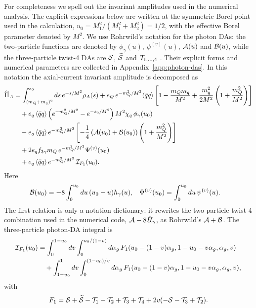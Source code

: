 \documentclass[aps,prd,preprint,nofootinbib,superscriptaddress]{revtex4-2}
\newcommand{\qqbar}{\langle\bar q q\rangle}
\begin{document}
For completeness we spell out the invariant amplitudes used in the numerical
analysis.  The explicit expressions below are written at the symmetric Borel
point used in the calculation, $u_0=M_1^2/(M_1^2+M_2^2)=1/2$, with the effective
Borel parameter denoted by $M^2$.  We use Rohrwild's notation for the photon
DAs: the two-particle functions are denoted by
$\phi_\gamma(u)$, $\psi^{(v)}(u)$, ${\cal A}(u)$ and ${\cal B}(u)$, while the
three-particle twist-4 DAs are
${\cal S}$, $\widetilde{\cal S}$ and ${\cal T}_{1,\ldots,4}$
\cite{Rohrwild:2007yt}.  Their explicit forms and numerical parameters are
collected in Appendix~\ref{app:photon-das}.  In this notation the
axial-current invariant amplitude is decomposed as
\begin{align}
  \widehat\Pi_A
  &=
  \int_{(m_Q+m_q)^2}^{s_0}ds\,e^{-s/M^2}\rho_A(s)
  +e_Q\,e^{-m_Q^2/M^2}\qqbar
  \left[
    1-\frac{m_Q m_q}{M^2}
    +\frac{m_q^2}{2M^2}\left(1+\frac{m_Q^2}{M^2}\right)
  \right]
  \notag\\
  &\quad
  +e_q\,\qqbar\left(e^{-m_Q^2/M^2}-e^{-s_0/M^2}\right)
  M^2\chi_q\,\phi_\gamma(u_0)
  \notag\\
  &\quad
  -e_q\,\qqbar\,e^{-m_Q^2/M^2}
  \left[
    -\frac14\left({\cal A}(u_0)+{\cal B}(u_0)\right)
    \left(1+\frac{m_Q^2}{M^2}\right)
  \right]
  \notag\\
  &\quad
  +2e_q f_{3\gamma}m_Q\,e^{-m_Q^2/M^2}\Psi^{(v)}(u_0)
  \notag\\
  &\quad
  +e_q\,\qqbar\,e^{-m_Q^2/M^2}\,{\cal I}_{F_1}(u_0).
  \label{eq:pi-a-explicit}
\end{align}
Here
\begin{align}
  {\cal B}(u_0)
  &=-8\int_0^{u_0}du\,(u_0-u)h_\gamma(u),
  &
  \Psi^{(v)}(u_0)
  &=\int_0^{u_0}du\,\psi^{(v)}(u).
  \label{eq:b-psi-def}
\end{align}
The first relation is only a notation dictionary: it rewrites the
two-particle twist-4 combination used in the numerical code,
${\cal A}-8\bar H_\gamma$, as Rohrwild's
${\cal A}+{\cal B}$.  The three-particle photon-DA integral is
\begin{align}
  {\cal I}_{F_1}(u_0)
  &=
  \int_0^{1-u_0}dv\int_0^{u_0/(1-v)}d\alpha_g\,
  F_1(u_0-(1-v)\alpha_g,1-u_0-v\alpha_g,\alpha_g,v)
  \notag\\
  &\quad
  +\int_{1-u_0}^{1}dv\int_0^{(1-u_0)/v}d\alpha_g\,
  F_1(u_0-(1-v)\alpha_g,1-u_0-v\alpha_g,\alpha_g,v),
  \label{eq:f1-integral}
\end{align}
with
\begin{equation}
  F_1={\cal S}+\widetilde{\cal S}-{\cal T}_1-{\cal T}_2+{\cal T}_3+{\cal T}_4
  +2v(-{\cal S}-{\cal T}_3+{\cal T}_2).
  \label{eq:f1-combination}
\end{equation}
\end{document}
